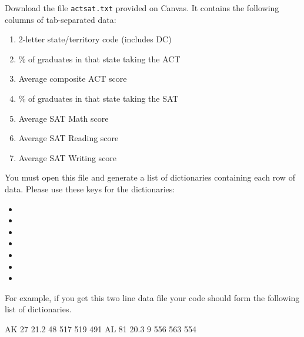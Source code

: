 \documentclass[11pt]{cselabheader}
\begin{document}
\begin{ex}[readscores.py]
  Download the file \texttt{actsat.txt} provided on Canvas. It contains the
  following columns of tab-separated data:

  \begin{enumerate}
    \item 2-letter state/territory code (includes DC)
    \item \% of graduates in that state taking the ACT
    \item Average composite ACT score
    \item \% of graduates in that state taking the SAT
    \item Average SAT Math score
    \item Average SAT Reading score
    \item Average SAT Writing score
  \end{enumerate}

  You must open this file and generate a list of dictionaries containing each
  row of data. Please use these keys for the dictionaries:
  \begin{multicols}{3}
  \begin{itemize}
  \item {}
  \item {}
  \item {}
  \item {}
  \item {}
  \item {}
  \item {}
  \end{itemize}
  \end{multicols}

  For example, if you get this two line data file your code should
  form the following list of dictionaries.

  \begin{verbatimcode}
AK      27      21.2    48      517     519     491
AL      81      20.3    9       556     563     554
  \end{verbatimcode}

  \begin{python3code}
  \end{python3code}
\end{ex}
\end{document}
